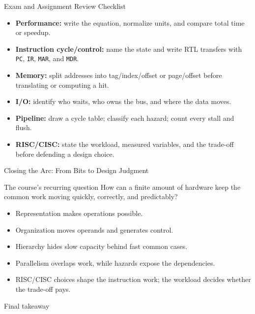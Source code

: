 \documentclass[aspectratio=169]{beamer}
\begin{document}
\begin{frame}{Exam and Assignment Review Checklist}
  \begin{itemize}
    \item \textbf{Performance:} write the equation, normalize units, and
      compare total time or speedup.
    \item \textbf{Instruction cycle/control:} name the state and write RTL
      transfers with \texttt{PC}, \texttt{IR}, \texttt{MAR}, and \texttt{MDR}.
    \item \textbf{Memory:} split addresses into tag/index/offset or
      page/offset before translating or computing a hit.
    \item \textbf{I/O:} identify who waits, who owns the bus, and where the
      data moves.
    \item \textbf{Pipeline:} draw a cycle table; classify each hazard; count
      every stall and flush.
    \item \textbf{RISC/CISC:} state the workload, measured variables, and the
      trade-off before defending a design choice.
  \end{itemize}
\end{frame}

\begin{frame}{Closing the Arc: From Bits to Design Judgment}
  \footnotesize
  \begin{block}{The course's recurring question}
    How can a finite amount of hardware keep the common work moving quickly,
    correctly, and predictably?
  \end{block}
  \begin{itemize}
    \item Representation makes operations possible.
    \item Organization moves operands and generates control.
    \item Hierarchy hides slow capacity behind fast common cases.
    \item Parallelism overlaps work, while hazards expose the dependencies.
    \item RISC/CISC choices shape the instruction work; the workload decides
      whether the trade-off pays.
  \end{itemize}
  \begin{exampleblock}{Final takeaway}
  \end{exampleblock}
\end{frame}
\end{document}
